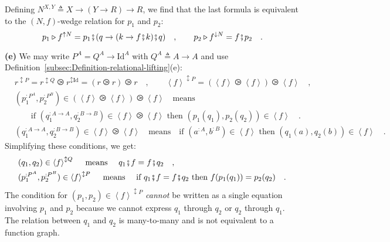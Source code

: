 Defining $N^{X,Y}\triangleq X\rightarrow\left(Y\rightarrow R\right)\rightarrow R$,
we find that the last formula is equivalent to the $\left(N,f\right)$-wedge
relation for $p_{1}$ and $p_{2}$:
\[
p_{1}\triangleright f^{\uparrow N}=p_{1}\bef(q\rightarrow(k\rightarrow f\bef k)\bef q)\quad,\quad\quad p_{2}\triangleright f^{\downarrow N}=f\bef p_{2}\quad.
\]

\textbf{(e)} We may write $P^{A}=Q^{A}\rightarrow\text{Id}^{A}$ with
$Q^{A}\triangleq A\rightarrow A$ and use Definition~\ref{subsec:Definition-relational-lifting}(e):
\begin{align*}
 & r^{\updownarrow P}=r^{\updownarrow Q}\ogreaterthan r^{\updownarrow\text{Id}}=(r\ogreaterthan r)\ogreaterthan r\quad,\quad\quad\left<f\right>^{\updownarrow P}=(\left<f\right>\ogreaterthan\left<f\right>)\ogreaterthan\left<f\right>\quad,\\
 & (p_{1}^{:P^{A}},p_{2}^{:P^{B}})\in(\left<f\right>\ogreaterthan\left<f\right>)\ogreaterthan\left<f\right>\quad\text{means}\\
 & \quad\quad\text{if }(q_{1}^{:A\rightarrow A},q_{2}^{:B\rightarrow B})\in\left<f\right>\ogreaterthan\left<f\right>\text{ then }(p_{1}(q_{1}),p_{2}(q_{2}))\in\left<f\right>\quad.\\
 & (q_{1}^{:A\rightarrow A},q_{2}^{:B\rightarrow B})\in\left<f\right>\ogreaterthan\left<f\right>\quad\text{means}\quad\text{if }(a^{:A},b^{:B})\in\left<f\right>\text{ then }(q_{1}(a),q_{2}(b))\in\left<f\right>\quad.
\end{align*}
Simplifying these conditions, we get:
\begin{align}
 & (q_{1},q_{2})\in\left<f\right>^{\updownarrow Q}\quad\text{ means }\quad q_{1}\bef f=f\bef q_{2}\quad,\nonumber \\
 & (p_{1}^{:P^{A}},p_{2}^{:P^{B}})\in\left<f\right>^{\updownarrow P}\quad\text{ means }\quad\text{if }q_{1}\bef f=f\bef q_{2}\text{ then }f(p_{1}(q_{1}))=p_{2}(q_{2})\quad.\label{eq:relational-lifting-example-e-derivation1}
\end{align}
The condition for $(p_{1},p_{2})\in\left<f\right>^{\updownarrow P}$
\emph{cannot} be written as a single equation involving $p_{1}$ and
$p_{2}$ because we cannot express $q_{1}$ through $q_{2}$ or $q_{2}$
through $q_{1}$. The relation between $q_{1}$ and $q_{2}$ is many-to-many
and is not equivalent to a function graph.

